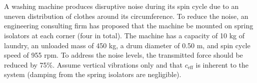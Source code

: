 \section{}

A washing machine produces disruptive noise during its spin cycle due to an uneven distribution of clothes around its circumference. To reduce the noise, an engineering consulting firm has proposed that the machine be mounted on spring isolators at each corner (four in total). The machine has a capacity of 10 kg of laundry, an unloaded mass of 450 kg, a drum diameter of 0.50 m, and spin cycle speed of 955 rpm. To address the noise levels, the transmitted force should be reduced by 75\%. Assume vertical vibrations only and that $c_{\text{eff}}$ is inherent to the system (damping from the spring isolators are negligible).


